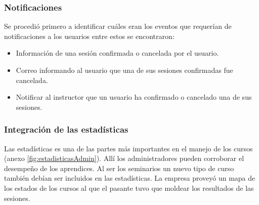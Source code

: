 \subsubsection{Notificaciones}

Se procedió primero a identificar cuáles eran los eventos que requerían de notificaciones a los usuarios entre estos se encontraron:

\begin{itemize}
	\item Información de una sesión confirmada o cancelada por el usuario.
	\item Correo informando al usuario que una de sus sesiones confirmadas fue cancelada.
	\item Notificar al instructor que un usuario ha confirmado o cancelado una de sus sesiones.
\end{itemize}

\subsubsection{Integración de las estadísticas}

Las estadísticas es una de las partes más importantes en el manejo de los cursos (anexo \ref{fig:estadisticasAdmin}). Allí los administradores pueden corroborar el desempeño de los aprendices. Al ser los seminarios un nuevo tipo de curso también debían ser incluidos en las estadísticas. La empresa proveyó un mapa de los estados de los cursos al que el pasante tuvo que moldear los resultados de las sesiones. 

